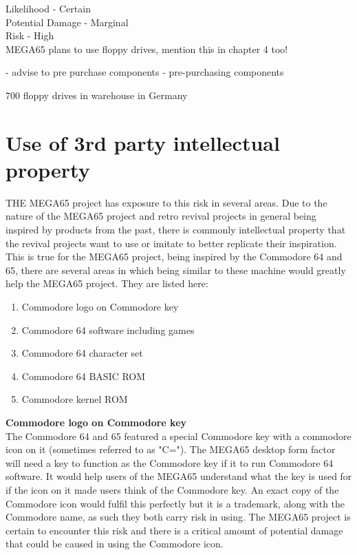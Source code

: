 Likelihood - Certain \\
Potential Damage - Marginal \\
Risk - High  \\

MEGA65 plans to use floppy drives, mention this in chapter 4 too!

- advise to pre purchase components 
- pre-purchasing components

700 floppy drives in warehouse in Germany

\section{Use of 3rd party intellectual property}
THE MEGA65 project has exposure to this risk in several areas. Due to the nature of the MEGA65 project and retro revival projects in general being inspired by products from the past, there is commonly intellectual property that the revival projects want to use or imitate to better replicate their inspiration. This is true for the MEGA65 project, being inspired by the Commodore 64 and 65, there are several areas in which being similar to these machine would greatly help the MEGA65 project. They are listed here:

\begin{enumerate}
\item Commodore logo on Commodore key
\item Commodore 64 software including games
\item Commodore 64 character set
\item Commodore 64 BASIC ROM
\item Commodore kernel ROM
\end{enumerate}

\textbf{Commodore logo on Commodore key} \\
The Commodore 64 and 65 featured a special Commodore key with a commodore icon on it (sometimes referred to as "C="). The MEGA65 desktop form factor will need a key to function as the Commodore key if it to run Commodore 64 software. It would help users of the MEGA65 understand what the key is used for if the icon on it made users think of the Commodore key. An exact copy of the Commodore icon would fulfil this perfectly but it is a trademark, along with the Commodore name, as such they both carry risk in using. The MEGA65 project is certain to encounter this risk and there is a critical amount of potential damage that could be caused in using the Commodore icon. \\

